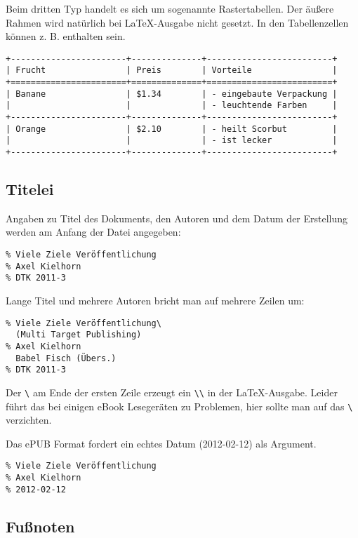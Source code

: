 \documentclass[11pt,ngerman,a4paper]{article}
\begin{document}
Beim dritten Typ handelt es sich um sogenannte Rastertabellen. Der
äußere Rahmen wird natürlich bei LaTeX-Ausgabe nicht gesetzt. In den
Tabellenzellen können z. B. enthalten sein.

\begin{verbatim}
+-----------------------+--------------+-------------------------+
| Frucht                | Preis        | Vorteile                |
+=======================+==============+=========================+
| Banane                | $1.34        | - eingebaute Verpackung |
|                       |              | - leuchtende Farben     |
+-----------------------+--------------+-------------------------+
| Orange                | $2.10        | - heilt Scorbut         |
|                       |              | - ist lecker            |
+-----------------------+--------------+-------------------------+
\end{verbatim}

\subsection{Titelei}

Angaben zu Titel des Dokuments, den Autoren und dem Datum der Erstellung
werden am Anfang der Datei angegeben:

\begin{verbatim}
% Viele Ziele Veröffentlichung
% Axel Kielhorn
% DTK 2011-3
\end{verbatim}

Lange Titel und mehrere Autoren bricht man auf mehrere Zeilen um:

\begin{verbatim}
% Viele Ziele Veröffentlichung\
  (Multi Target Publishing)
% Axel Kielhorn
  Babel Fisch (Übers.)
% DTK 2011-3
\end{verbatim}

Der \texttt{\textbackslash{}} am Ende der ersten Zeile erzeugt ein
\texttt{\textbackslash{}\textbackslash{}} in der LaTeX-Ausgabe. Leider
führt das bei einigen eBook Lesegeräten zu Problemen, hier sollte man
auf das \texttt{\textbackslash{}} verzichten.

Das ePUB Format fordert ein echtes Datum (2012-02-12) als Argument.

\begin{verbatim}
% Viele Ziele Veröffentlichung
% Axel Kielhorn
% 2012-02-12
\end{verbatim}

\subsection{Fußnoten}
\end{document}
